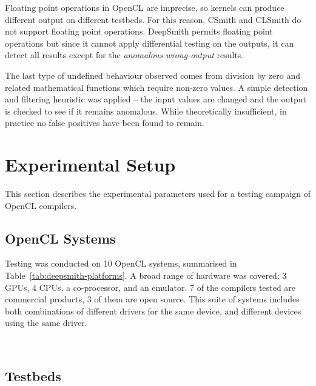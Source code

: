 Floating point operations in OpenCL are imprecise, so kernels can produce different output on different testbeds. For this reason, CSmith and CLSmith do not support floating point operations. DeepSmith permits floating point operations but since it cannot apply differential testing on the outputs, it can detect all results except for the \emph{anomalous wrong-output} results.

The last type of undefined behaviour observed comes from division by zero and related mathematical functions which require non-zero values. A simple detection and filtering heuristic was applied -- the input values are changed and the output is checked to see if it remains anomalous. While theoretically insufficient, in practice no false positives have been found to remain.


\section{Experimental Setup}
\label{sec:deepsmith-experimental-setup}

This section describes the experimental parameters used for a testing campaign of OpenCL compilers.


\subsection{OpenCL Systems}

Testing was conducted on 10 OpenCL systems, summarised in Table~\ref{tab:deepsmith-platforms}. A broad range of hardware was covered: 3 GPUs, 4 CPUs, a co-processor, and an emulator. 7 of the compilers tested are commercial products, 3 of them are open source. This suite of systems includes both combinations of different drivers for the same device, and different devices using the same driver.

\begin{table}
  \centering %
  \subfloat[][]{}\\%
  \subfloat[][]{} %
  \caption[OpenCL systems and the number of bug reports submitted to date]{%
    OpenCL systems and the number of bug reports submitted to date (22\% of which have been fixed, the remainder are pending). For each system, two testbeds are created, one with compiler optimisations, the other without.%
  }
  \label{tab:deepsmith-platforms}
\end{table}


\subsection{Testbeds}

